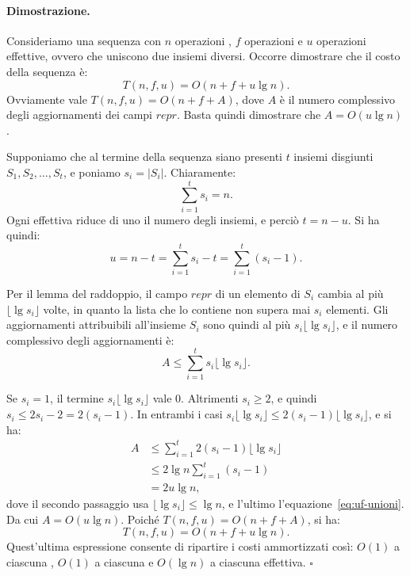 \paragraph{Dimostrazione.}
Consideriamo una sequenza con $n$ operazioni \MakeSet{}, $f$ operazioni \FindSet{} e $u$ operazioni \Union{} effettive, ovvero che uniscono due insiemi diversi. Occorre dimostrare che il costo della sequenza è:
\[
T(n,f,u) = O(n + f + u \lg n).
\]
Ovviamente vale $T(n,f,u) = O(n + f + A)$, dove $A$ è il numero complessivo degli aggiornamenti dei campi $\mathit{repr}$. Basta quindi dimostrare che $A = O(u \lg n)$.

Supponiamo che al termine della sequenza siano presenti $t$ insiemi disgiunti $S_1, S_2, \ldots, S_t$, e poniamo $s_i = |S_i|$. Chiaramente:
\[
\sum_{i=1}^{t} s_i = n.
\]
Ogni \Union{} effettiva riduce di uno il numero degli insiemi, e perciò $t = n - u$. Si ha quindi:
\begin{equation}\label{eq:uf-unioni}
u = n - t = \sum_{i=1}^{t} s_i - t = \sum_{i=1}^{t} (s_i - 1).
\end{equation}

Per il lemma del raddoppio, il campo $\mathit{repr}$ di un elemento di $S_i$ cambia al più $\lfloor \lg s_i \rfloor$ volte, in quanto la lista che lo contiene non supera mai $s_i$ elementi. Gli aggiornamenti attribuibili all'insieme $S_i$ sono quindi al più $s_i \lfloor \lg s_i \rfloor$, e il numero complessivo degli aggiornamenti è:
\[
A \le \sum_{i=1}^{t} s_i \lfloor \lg s_i \rfloor.
\]

Se $s_i = 1$, il termine $s_i \lfloor \lg s_i \rfloor$ vale $0$. Altrimenti $s_i \ge 2$, e quindi $s_i \le 2s_i - 2 = 2(s_i - 1)$. In entrambi i casi $s_i \lfloor \lg s_i \rfloor \le 2(s_i - 1) \lfloor \lg s_i \rfloor$, e si ha:
\[
\begin{aligned}
A &\le \sum_{i=1}^{t} 2(s_i - 1) \lfloor \lg s_i \rfloor \\
&\le 2 \lg n \sum_{i=1}^{t} (s_i - 1) \\
&= 2u \lg n,
\end{aligned}
\]
dove il secondo passaggio usa $\lfloor \lg s_i \rfloor \le \lg n$, e l'ultimo l'equazione~\eqref{eq:uf-unioni}. Da cui $A = O(u \lg n)$. Poiché $T(n,f,u) = O(n + f + A)$, si ha:
\[
T(n,f,u) = O(n + f + u \lg n).
\]
Quest'ultima espressione consente di ripartire i costi ammortizzati così: $O(1)$ a ciascuna \MakeSet{}, $O(1)$ a ciascuna \FindSet{} e $O(\lg n)$ a ciascuna \Union{} effettiva. \hfill $\square$

